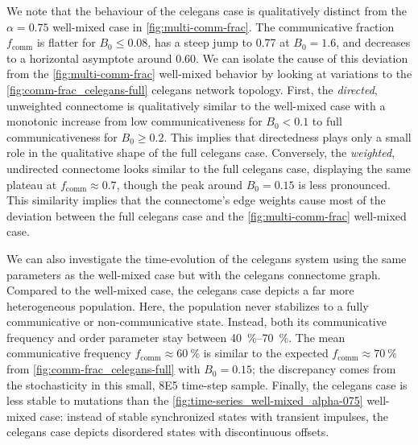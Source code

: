 \documentclass[pdflatex,lineno,referee,sn-nature]{sn-jnl}
\begin{document}
We note that the behaviour
of the  \gls{celegans} case
is qualitatively distinct
from the $\alpha = 0.75$ well-mixed case in \cref{fig:multi-comm-frac}.
The communicative fraction $f_{\text{comm}}$
is flatter for $B_0 \le 0.08$,
has a steep jump to \num{0.77} at $B_0 = 1.6$,
and decreases to a horizontal asymptote around \num{0.60}.
We can isolate the cause of this deviation
from the \cref{fig:multi-comm-frac} well-mixed
behavior by looking at variations to the \cref{fig:comm-frac_celegans-full}
\gls{celegans} network topology.
First, the 
\emph{directed}, unweighted connectome
is qualitatively similar to the
well-mixed case with a monotonic increase
from low communicativeness for $B_0 < 0.1$
to full communicativeness for $B_0 \ge 0.2$.
This implies that directedness
plays only a small role in the qualitative shape
of the  full \gls{celegans} case.
Conversely,
the 
\emph{weighted}, undirected connectome
looks similar to the 
full \gls{celegans} case,
displaying the same plateau at $f_{\text{comm}} \approx 0.7$,
though the peak around $B_0 = 0.15$ is less pronounced.
This similarity implies that the connectome's edge weights
cause most of the deviation
between the  full \gls{celegans}
case and the \cref{fig:multi-comm-frac} well-mixed case.

We can also investigate the time-evolution of the \gls{celegans} system
using the same parameters as the
well-mixed case but with the \gls{celegans} connectome graph.
Compared to the well-mixed case,
the  \gls{celegans} case
depicts a far more heterogeneous population.
Here, the population never stabilizes
to a fully communicative or non-communicative state.
Instead, both its communicative frequency and order parameter
stay between \SIrange{40}{70}{\percent}.
The mean communicative frequency $f_{\text{comm}} \approx \SI{60}{\percent}$
is similar to the expected $f_{\text{comm}} \approx \SI{70}{\percent}$
from \cref{fig:comm-frac_celegans-full} with $B_0 = 0.15$;
the discrepancy comes from the stochasticity
in this small, \num{8E5} time-step sample.
Finally, the \gls{celegans} case is less stable to mutations
than the \cref{fig:time-series_well-mixed_alpha-075} well-mixed case:
instead of stable synchronized states with transient impulses,
the \gls{celegans} case depicts disordered states with discontinuous offsets.
\end{document}
